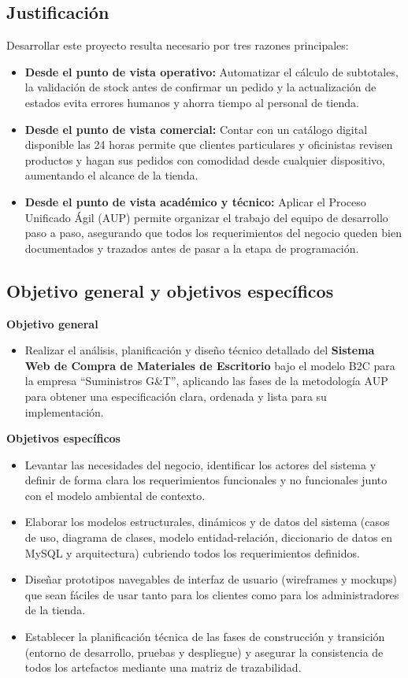 \subsection{Justificación}
Desarrollar este proyecto resulta necesario por tres razones principales:
\begin{itemize}
    \item \textbf{Desde el punto de vista operativo:} Automatizar el cálculo de subtotales, la validación de stock antes de confirmar un pedido y la actualización de estados evita errores humanos y ahorra tiempo al personal de tienda.
    \item \textbf{Desde el punto de vista comercial:} Contar con un catálogo digital disponible las 24 horas permite que clientes particulares y oficinistas revisen productos y hagan sus pedidos con comodidad desde cualquier dispositivo, aumentando el alcance de la tienda.
    \item \textbf{Desde el punto de vista académico y técnico:} Aplicar el Proceso Unificado Ágil (AUP) permite organizar el trabajo del equipo de desarrollo paso a paso, asegurando que todos los requerimientos del negocio queden bien documentados y trazados antes de pasar a la etapa de programación.
\end{itemize}

\subsection{Objetivo general y objetivos específicos}

\textbf{Objetivo general}
\begin{itemize}
    \item Realizar el análisis, planificación y diseño técnico detallado del \textbf{Sistema Web de Compra de Materiales de Escritorio} bajo el modelo B2C para la empresa ``Suministros G\&T'', aplicando las fases de la metodología AUP para obtener una especificación clara, ordenada y lista para su implementación.
\end{itemize}

\textbf{Objetivos específicos}
\begin{itemize}
    \item Levantar las necesidades del negocio, identificar los actores del sistema y definir de forma clara los requerimientos funcionales y no funcionales junto con el modelo ambiental de contexto.
    \item Elaborar los modelos estructurales, dinámicos y de datos del sistema (casos de uso, diagrama de clases, modelo entidad-relación, diccionario de datos en MySQL y arquitectura) cubriendo todos los requerimientos definidos.
    \item Diseñar prototipos navegables de interfaz de usuario (wireframes y mockups) que sean fáciles de usar tanto para los clientes como para los administradores de la tienda.
    \item Establecer la planificación técnica de las fases de construcción y transición (entorno de desarrollo, pruebas y despliegue) y asegurar la consistencia de todos los artefactos mediante una matriz de trazabilidad.
\end{itemize}

